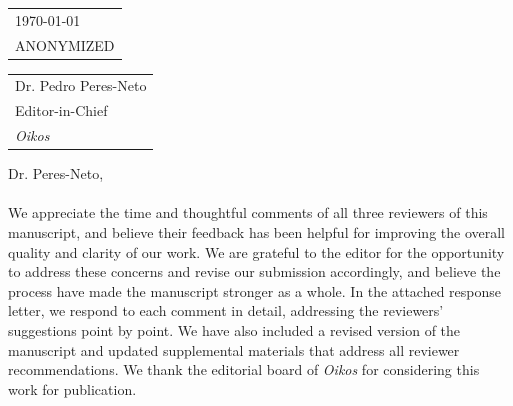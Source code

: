 \documentclass{article}
\begin{document}
\hfill
\begin{tabular}{l @{}}
	\today \bigskip\\ %
	ANONYMIZED\\
\end{tabular}

\bigskip %


\begin{tabular}{@{} l}
    Dr. Pedro Peres-Neto \\
	Editor-in-Chief \\
	\emph{Oikos} \\
\end{tabular}

\bigskip %

Dr. Peres-Neto,


\paragraph{}

We appreciate the time and thoughtful comments of all three reviewers of this manuscript, and believe their feedback has been helpful for improving the overall quality and clarity of our work. We are grateful to the editor for the opportunity to address these concerns and revise our submission accordingly, and believe the process have made the manuscript stronger as a whole. In the attached response letter, we respond to each comment in detail, addressing the reviewers' suggestions point by point. We have also included a revised version of the manuscript and updated supplemental materials that address all reviewer recommendations. We thank the editorial board of \emph{Oikos} for considering this work for publication.
\end{document}
